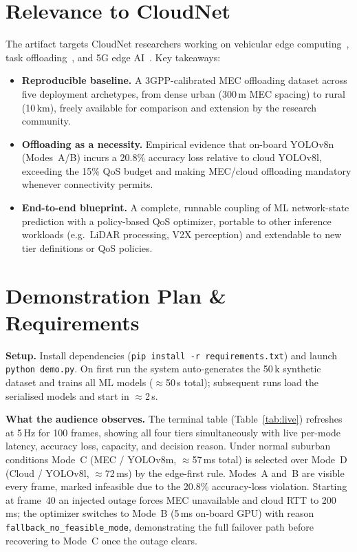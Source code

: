 \documentclass[10pt,conference]{IEEEtran}
\begin{document}
\section{Relevance to CloudNet}

The artifact targets CloudNet researchers working on vehicular edge
computing~\cite{shi2016edge}, task offloading~\cite{chen2019offloading}, and
5G edge AI~\cite{liu2020edge}.  Key takeaways:
\begin{itemize}
  \item \textbf{Reproducible baseline.}  A 3GPP-calibrated MEC offloading
        dataset across five deployment archetypes, from dense urban (300\,m
        MEC spacing) to rural (10\,km), freely available for comparison and
        extension by the research community.
  \item \textbf{Offloading as a necessity.}  Empirical evidence that on-board
        YOLOv8n (Modes~A/B) incurs a 20.8\% accuracy loss relative to cloud
        YOLOv8l, exceeding the 15\% QoS budget and making MEC/cloud
        offloading mandatory whenever connectivity permits.
  \item \textbf{End-to-end blueprint.}  A complete, runnable coupling of ML
        network-state prediction with a policy-based QoS optimizer, portable
        to other inference workloads (e.g.\ LiDAR processing, V2X perception)
        and extendable to new tier definitions or QoS policies.
\end{itemize}

\section{Demonstration Plan \& Requirements}

\textbf{Setup.}
Install dependencies (\texttt{pip install -r requirements.txt}) and launch
\texttt{python demo.py}.  On first run the system auto-generates the 50\,k
synthetic dataset and trains all ML models ($\approx$50\,s total);
subsequent runs load the serialised models and start in $\approx$2\,s.

\textbf{What the audience observes.}
The terminal table (Table~\ref{tab:live}) refreshes at 5\,Hz for 100 frames,
showing all four tiers simultaneously with live per-mode latency, accuracy
loss, capacity, and decision reason.  Under normal suburban conditions Mode~C
(MEC / YOLOv8m, $\approx$57\,ms total) is selected over Mode~D (Cloud /
YOLOv8l, $\approx$72\,ms) by the edge-first rule.  Modes~A and~B are visible
every frame, marked infeasible due to the 20.8\% accuracy-loss violation.
Starting at frame~40 an injected outage forces MEC unavailable and cloud RTT
to 200\,ms; the optimizer switches to Mode~B (5\,ms on-board GPU) with reason
\texttt{fallback\_no\_feasible\_mode}, demonstrating the full failover path
before recovering to Mode~C once the outage clears.
\end{document}
